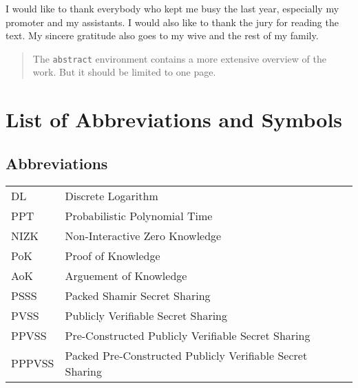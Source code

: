 \documentclass[master=mcs]{kulemt}
\begin{document}
\begin{preface}
  I would like to thank everybody who kept me busy the last year,
  especially my promoter and my assistants. I would also like to thank the
  jury for reading the text. My sincere gratitude also goes to my wive and
  the rest of my family.
\end{preface}

\tableofcontents*

\begin{abstract}
  The \texttt{abstract} environment contains a more extensive overview of
  the work. But it should be limited to one page.

  \lipsum[1]
\end{abstract}

\listoffiguresandtables
\chapter{List of Abbreviations and Symbols}
\section*{Abbreviations}
\begin{flushleft}
  \renewcommand{\arraystretch}{1.1}
  \begin{tabularx}{\textwidth}{@{}p{12mm}X@{}}
    DL & Discrete Logarithm \\
    PPT & Probabilistic Polynomial Time \\
    NIZK   & Non-Interactive Zero Knowledge \\
    PoK   & Proof of Knowledge \\
    AoK  & Arguement of Knowledge \\
    PSSS & Packed Shamir Secret Sharing \\
    PVSS & Publicly Verifiable Secret Sharing \\
    PPVSS & Pre-Constructed Publicly Verifiable Secret Sharing \\
    PPPVSS & Packed Pre-Constructed Publicly Verifiable Secret Sharing \\
  \end{tabularx}
\end{flushleft}
\end{document}
